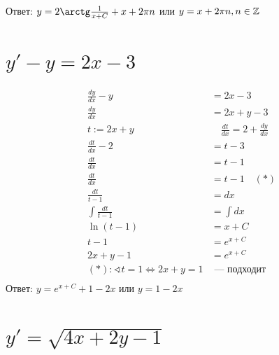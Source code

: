 Ответ: $y = 2\arctg\frac{1}{x + C} + x + 2\pi n$ или $y = x + 2\pi n, n\in \mathbb{Z}$


\section{$y'-y=2x-3$}

\begin{align*}
    \frac{dy}{dx} - y                                 & = 2x-3                                  \\
    \frac{dy}{dx}                                     & = 2x + y -3                             \\
    t := 2x + y                                       & \quad \frac{dt}{dx} = 2 + \frac{dy}{dx} \\
    \frac{dt}{dx} - 2                                 & = t - 3                                 \\
    \frac{dt}{dx}                                     & = t - 1                                 \\
    \frac{dt}{dx}                                     & = t - 1 \quad (*)                       \\
    \frac{dt}{t - 1}                                  & =  dx                                   \\
    \int \frac{dt}{t - 1}                             & = \int dx                               \\
    \ln(t - 1)                                        & = x + C                                 \\
    t-1                                               & = e^{x + C}                             \\
    2x+y-1                                            & = e^{x + C}                             \\
    (*): \sphericalangle t=1 \Leftrightarrow 2x+y = 1 & \text{ --- подходит}                    \\
\end{align*}
Ответ: $y = e^{x + C} + 1 - 2x$ или $y = 1 - 2x$

\section{$y'=\sqrt{4x+2y-1}$}

